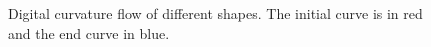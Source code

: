\documentclass[runningheads]{llncs}
\begin{document}
\begin{figure}[!ht]
		\hspace{15pt}
		\hspace{15pt}
		\caption{Digital curvature flow of different shapes. The initial curve is in red and the end curve in blue.}
		\label{fig:digital_flows}	
	\end{figure}
\end{document}
